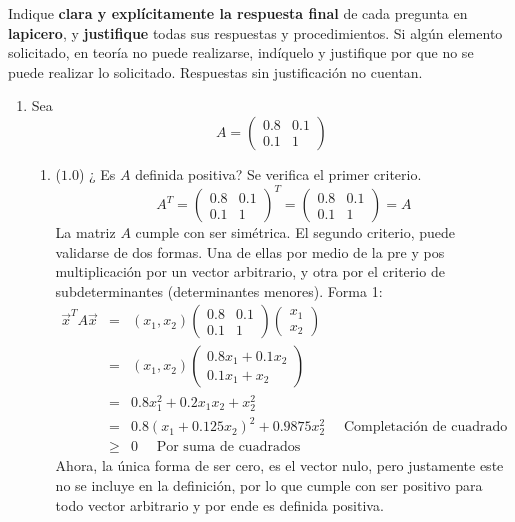 \documentclass[12pt]{article}
\begin{document}
Indique \textbf{clara y explícitamente la respuesta final} de cada pregunta en \textbf{lapicero}, y \textbf{justifique} todas sus respuestas y procedimientos. Si algún elemento solicitado, en teoría no puede realizarse, indíquelo y justifique por que no se puede realizar lo solicitado. Respuestas sin justificación no cuentan.
  \begin{enumerate}[leftmargin=*,widest=9]
    \item Sea
    \[
    A = \begin{pmatrix}
    0.8 & 0.1\\ 0.1 & 1
    \end{pmatrix}
    \]
    \begin{enumerate}[label=\alph*]
    \item (\(1.0\)) ¿ Es \(A\) definida positiva?
    Se verifica el primer criterio.
    \[
    A^T = \begin{pmatrix}
    0.8 & 0.1\\ 0.1 & 1
    \end{pmatrix}^T = \begin{pmatrix}
    0.8 & 0.1\\ 0.1 & 1
    \end{pmatrix} = A
    \]
    La matriz \(A\) cumple con ser simétrica.
    El segundo criterio, puede validarse de dos formas. Una de ellas por medio de la pre y pos multiplicación por un vector arbitrario, y otra por el criterio de subdeterminantes (determinantes menores).
    Forma 1:
    \begin{eqnarray*}
    \vec{x}^T A \vec{x} & = & (x_1, x_2) \begin{pmatrix}
    0.8 & 0.1\\ 0.1 & 1
    \end{pmatrix} \begin{pmatrix}
    x_1\\ x_2
    \end{pmatrix} \\
    & = & (x_1, x_2) \begin{pmatrix}
    0.8x_1+0.1x_2\\ 0.1x_1+x_2
    \end{pmatrix} \\
    & = & 0.8x_1^2 +0.2x_1x_2 + x_2^2\\
    & = & 0.8(x_1+0.125x_2)^2+0.9875x_2^2 \quad \text{ Completación de cuadrado} \\
    & \geq & 0 \quad \text{ Por suma de cuadrados}
    \end{eqnarray*}
    Ahora, la única forma de ser cero, es el vector nulo, pero justamente este no se incluye en la definición, por lo que cumple con ser positivo para todo vector arbitrario y por ende es definida positiva.

\end{enumerate}
\end{enumerate}
\end{document}
